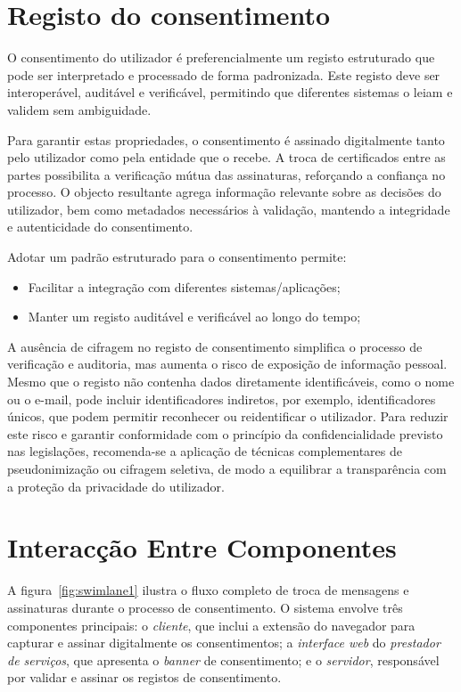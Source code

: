 \section{Registo do consentimento}

O consentimento do utilizador é preferencialmente um registo estruturado que pode ser interpretado e processado de forma padronizada. Este registo deve ser interoperável, auditável e verificável, permitindo que diferentes sistemas o leiam e validem sem ambiguidade.

Para garantir estas propriedades, o consentimento é assinado digitalmente tanto pelo utilizador como pela entidade que o recebe. A troca de certificados entre as partes possibilita a verificação mútua das assinaturas, reforçando a confiança no processo. O objecto resultante agrega informação relevante sobre as decisões do utilizador, bem como metadados necessários à validação, mantendo a integridade e autenticidade do consentimento.

Adotar um padrão estruturado para o consentimento permite:
\begin{itemize}
    \item Facilitar a integração com diferentes sistemas/aplicações;
    \item Manter um registo auditável e verificável ao longo do tempo;
\end{itemize}

A ausência de cifragem no registo de consentimento simplifica o processo de verificação e auditoria, mas aumenta o risco de exposição de informação pessoal. Mesmo que o registo não contenha dados diretamente identificáveis, como o nome ou o e-mail, pode incluir identificadores indiretos, por exemplo, identificadores únicos, que podem permitir reconhecer ou reidentificar o utilizador. Para reduzir este risco e garantir conformidade com o princípio da confidencialidade previsto nas legislações, recomenda-se a aplicação de técnicas complementares de pseudonimização ou cifragem seletiva, de modo a equilibrar a transparência com a proteção da privacidade do utilizador.

\section{Interacção Entre Componentes}

A figura~\ref{fig:swimlane1} ilustra o fluxo completo de troca de mensagens e assinaturas durante o processo de consentimento. O sistema envolve três componentes principais: o \textit{cliente}, que inclui a extensão do navegador para capturar e assinar digitalmente os consentimentos; a \textit{interface web} do \textit{prestador de serviços}, que apresenta o \textit{banner} de consentimento; e o \textit{servidor}, responsável por validar e assinar os registos de consentimento.

